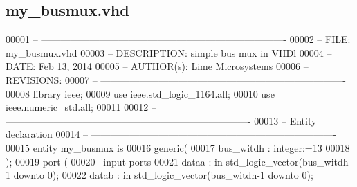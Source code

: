 \subsection{my\+\_\+busmux.\+vhd}
\label{my__busmux_8vhd_source}

\begin{DoxyCode}
00001 \textcolor{keyword}{-- ---------------------------------------------------------------------------- }
00002 \textcolor{keyword}{-- FILE:    my\_busmux.vhd}
00003 \textcolor{keyword}{-- DESCRIPTION: simple bus mux in VHDl}
00004 \textcolor{keyword}{-- DATE:    Feb 13, 2014}
00005 \textcolor{keyword}{-- AUTHOR(s):   Lime Microsystems}
00006 \textcolor{keyword}{-- REVISIONS:}
00007 \textcolor{keyword}{-- ---------------------------------------------------------------------------- }
00008 \textcolor{vhdlkeyword}{library }\textcolor{keywordflow}{ieee};
00009 \textcolor{vhdlkeyword}{use }ieee.std\_logic\_1164.\textcolor{keywordflow}{all};
00010 \textcolor{vhdlkeyword}{use }ieee.numeric\_std.\textcolor{keywordflow}{all};
00011 
00012 \textcolor{keyword}{-- ----------------------------------------------------------------------------}
00013 \textcolor{keyword}{-- Entity declaration}
00014 \textcolor{keyword}{-- ----------------------------------------------------------------------------}
00015 \textcolor{keywordflow}{entity }my_busmux \textcolor{keywordflow}{is}
00016     \textcolor{keywordflow}{generic}\textcolor{vhdlchar}{(}
00017                 \textcolor{vhdlchar}{bus_witdh} \textcolor{vhdlchar}{:} \textcolor{comment}{integer}\textcolor{vhdlchar}{:=}\textcolor{vhdllogic}{}\textcolor{vhdllogic}{13}
00018                 \textcolor{vhdlchar}{)};
00019   \textcolor{keywordflow}{port} \textcolor{vhdlchar}{(}
00020 \textcolor{keyword}{        --input ports }
00021         \textcolor{vhdlchar}{dataa}           \textcolor{vhdlchar}{:} \textcolor{keywordflow}{in} \textcolor{comment}{std\_logic\_vector}\textcolor{vhdlchar}{(}\textcolor{vhdlchar}{bus_witdh}\textcolor{vhdlchar}{-}\textcolor{vhdllogic}{}\textcolor{vhdllogic}{1} \textcolor{keywordflow}{downto} \textcolor{vhdllogic}{}\textcolor{vhdllogic}{0}\textcolor{vhdlchar}{)};
00022         \textcolor{vhdlchar}{datab}           \textcolor{vhdlchar}{:} \textcolor{keywordflow}{in} \textcolor{comment}{std\_logic\_vector}\textcolor{vhdlchar}{(}\textcolor{vhdlchar}{bus_witdh}\textcolor{vhdlchar}{-}\textcolor{vhdllogic}{}\textcolor{vhdllogic}{1} \textcolor{keywordflow}{downto} \textcolor{vhdllogic}{}\textcolor{vhdllogic}{0}\textcolor{vhdlchar}{)};

\end{DoxyCode}
